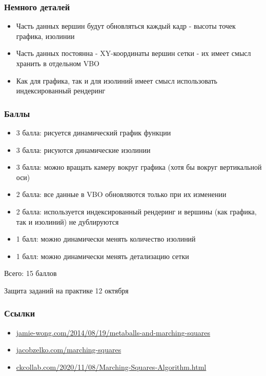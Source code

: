 \documentclass{beamer}
\begin{document}
\begin{frame}[fragile]
\frametitle{Немного деталей}
\begin{itemize}
\item Часть данных вершин будут обновляться каждый кадр - высоты точек графика, изолинии
\item Часть данных постоянна - XY-координаты вершин сетки - их имеет смысл хранить в отдельном VBO
\item Как для графика, так и для изолиний имеет смысл использовать индексированный рендеринг
\end{itemize}
\end{frame}

\begin{frame}[fragile]
\frametitle{Баллы}
\begin{itemize}
\item 3 балла: рисуется динамический график функции
\item 3 балла: рисуются динамические изолинии
\item 3 балла: можно вращать камеру вокруг графика (хотя бы вокруг вертикальной оси)
\item 2 балла: все данные в VBO обновляются только при их изменении
\item 2 балла: используется индексированный рендеринг и вершины (как графика, так и изолиний) не дублируются
\item 1 балл:  можно динамически менять количество изолиний
\item 1 балл:  можно динамически менять детализацию сетки
\end{itemize}
Всего: 15 баллов

Защита заданий на практике 12 октября
\end{frame}

\begin{frame}[fragile]
\frametitle{Ссылки}
\begin{itemize}
\item \href{http://jamie-wong.com/2014/08/19/metaballs-and-marching-squares}{jamie-wong.com/2014/08/19/metaballs-and-marching-squares}
\item \href{http://jacobzelko.com/marching-squares/}{jacobzelko.com/marching-squares}
\item \href{https://ckcollab.com/2020/11/08/Marching-Squares-Algorithm.html}{ckcollab.com/2020/11/08/Marching-Squares-Algorithm.html}
\end{itemize}
\end{frame}
\end{document}
